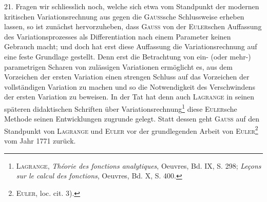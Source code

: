 21. Fragen wir schliesslich noch, welche  sich etwa vom
Standpunkt der modernen kritischen Variationsrechnung aus gegen die \textsc{Gauss}sche
Schlussweise erheben lassen, so ist zunächst hervorzuheben, dass \textsc{Gauss}
von der \textsc{Euler}schen Auffassung des Variationsprozesses als Differentiation nach
einem Parameter keinen Gebrauch macht; und doch hat erst diese Auffassung
die Variationsrechnung auf eine feste Grundlage gestellt. Denn erst die Betrachtung
von ein- (oder mehr-) parametrigen Scharen von zulässigen Variationen
ermöglicht es, aus dem Vorzeichen der ersten Variation einen strengen
Schluss auf das Vorzeichen der vollständigen Variation zu machen und so die
\clearpage{}
\noindent Notwendigkeit des Verschwindens der ersten Variation zu beweisen. In der
Tat hat denn auch \textsc{Lagrange} in seinen späteren didaktischen Schriften über
Variationsrechnung\footnote{\textsc{Lagrange}, \textit{Théorie des fonctions analytiques}, Oeuvres, Bd. IX, S. 298; \textit{Leçons sur le calcul des
fonctions}, Oeuvres, Bd. X, S. 400.} diese \textsc{Euler}sche Methode seinen Entwicklungen zugrunde
gelegt. Statt dessen geht \textsc{Gauss} auf den Standpunkt von \textsc{Lagrange} und \textsc{Euler}
vor der grundlegenden Arbeit von \textsc{Euler}\footnote{\textsc{Euler}, loc. cit. 3).} vom Jahr 1771 zurück.

